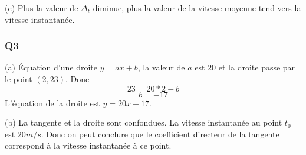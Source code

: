 \documentclass[]{book}
\theoremstyle{definition}
\begin{document}
(c)
Plus la valeur de $\Delta_t$ diminue, plus la valeur de la vitesse
moyenne tend vers la vitesse instantan\'ee.

\subsubsection*{Q3}
(a)
\'Equation d'une droite $y = ax + b$, la valeur de $a$ est $20$ et la
droite passe par le point $(2,23)$. Donc
$$23 = 20 * 2 - b$$
$$b = -17$$
L'\'equation de la droite est $y = 20x - 17$.

(b)
La tangente et la droite sont confondues. La vitesse instantan\'ee au
point $t_0$ est $20m/s$. Donc on peut conclure que le coefficient
directeur de la tangente correspond \`a la vitesse instantan\'ee \`a
ce point.
\end{document}
